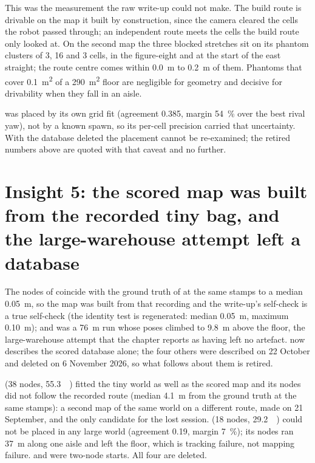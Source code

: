 \documentclass[11pt,a4paper,notitlepage]{report}
\newcommand{\insdir}{../../../../output/compare/simulation/exp4-insights}
\newcommand{\ins}[1]{}
\begin{document}
\ins{drivability.tex}
\ins{blocked_segments.tex}

This was the measurement the raw write-up could not make. The build route is
drivable on the map it built by construction, since the camera cleared the
cells the robot passed through; an independent route meets the cells the
build route only looked at. On the second map the three blocked stretches sit
on its phantom clusters of 3, 16 and 3 cells, in the figure-eight and at the
start of the east straight; the route centre comes within \SI{0.0}{\metre} to
\SI{0.2}{\metre} of them. Phantoms that cover \SI{0.1}{\square\metre} of a
\SI{290}{\square\metre} floor are negligible for geometry and decisive for
drivability when they fall in an aisle.

\begin{queried}
 was placed by its own grid fit (agreement 0.385, margin
\SI{54}{\percent} over the best rival yaw), not by a known spawn, so its
per-cell precision carried that uncertainty. With the database deleted the
placement cannot be re-examined; the retired numbers above are quoted with
that caveat and no further.
\end{queried}

\FloatBarrier
\section{Insight 5: the scored map was built from the recorded tiny bag, and
         the large-warehouse attempt left a database}

The nodes of  coincide with the ground truth of
 at the same stamps to a median \SI{0.05}{\metre}, so
the map was built from that recording and the write-up's self-check is a
true self-check (the identity test is regenerated: median \SI{0.05}{\metre},
maximum \SI{0.10}{\metre}); and  was a \SI{76}{\metre}
run whose poses climbed to \SI{9.8}{\metre} above the floor, the
large-warehouse attempt that the chapter reports as having left no artefact.
 now describes the scored database alone; the four
others were described on 22 October and deleted on 6 November 2026, so what
follows about them is retired.

\ins{databases.tex}

 (38 nodes, \SI{55.3}{\mega\byte}) fitted the tiny world as
well as the scored map and its nodes did not follow the recorded route
(median \SI{4.1}{\metre} from the ground truth at the same stamps): a second
map of the same world on a different route, made on 21 September, and the
only candidate for the lost  session.
 (18 nodes, \SI{29.2}{\mega\byte}) could not be placed in
any large world (agreement 0.19, margin \SI{7}{\percent}); its nodes ran
\SI{37}{\metre} along one aisle and left the floor, which is tracking
failure, not mapping failure.  and 
were two-node starts. All four are deleted.
\end{document}
